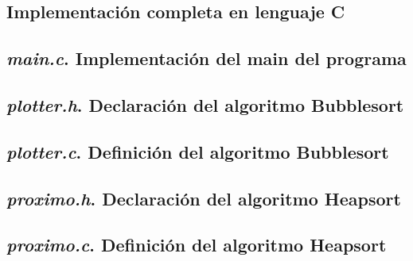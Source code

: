 \documentclass[9pt,a4paper]{article}
\begin{document}
\begin{appendices}

\bigskip\bigskip

\section{Implementación completa en lenguaje C}


\subsection{\textit{main.c}. Implementación del main del programa}
\lstset{ language = C } %
 
\bigskip\bigskip

\subsection{\textit{plotter.h}. Declaración del algoritmo Bubblesort}
\lstset{ language = C } %
 
\bigskip\bigskip

\subsection{\textit{plotter.c}. Definición del algoritmo Bubblesort}
\lstset{ language = C } %
 
\bigskip\bigskip

\subsection{\textit{proximo.h}. Declaración del algoritmo Heapsort}
\lstset{ language = C } %
 
\bigskip\bigskip

\subsection{\textit{proximo.c}. Definición del algoritmo Heapsort}
\lstset{ language = C } %
 
\newpage




\end{appendices}
\end{document}
